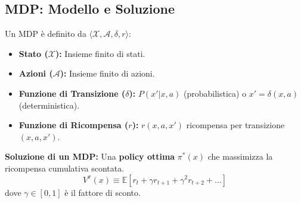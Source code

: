 \documentclass[a4paper,11pt]{article}
\begin{document}
\subsection{MDP: Modello e Soluzione}
Un MDP è definito da $\langle \mathcal{X}, \mathcal{A}, \delta, r \rangle$:
\begin{itemize}
    \item \textbf{Stato ($\mathcal{X}$):} Insieme finito di stati.
    \item \textbf{Azioni ($\mathcal{A}$):} Insieme finito di azioni.
    \item \textbf{Funzione di Transizione ($\delta$):} $P(x'|x, a)$ (probabilistica) o $x' = \delta(x, a)$ (deterministica).
    \item \textbf{Funzione di Ricompensa ($r$):} $r(x, a, x')$ ricompensa per transizione $(x, a, x')$.
\end{itemize}
\textbf{Soluzione di un MDP:} Una \textbf{policy ottima} $\pi^*(x)$ che massimizza la ricompensa cumulativa scontata.
\begin{equation}
    V^\pi(x) \equiv \mathbb{E}[r_t + \gamma r_{t+1} + \gamma^2 r_{t+2} + \dots]
\end{equation}
dove $\gamma \in [0,1]$ è il fattore di sconto.
\end{document}
